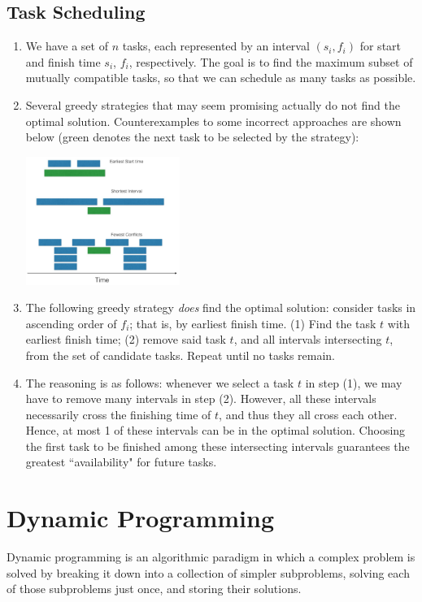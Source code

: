 \documentclass[10pt]{article}
\begin{document}
\begin{multicols}{2}
\begin{addmargin}[0.8em]{0.5em}
    \subsection{Task Scheduling}
    \begin{enumerate}[label=(\alph*)]
        \item We have a set of $n$ tasks, each represented by an interval $(s_i, f_i)$ for start and finish time $s_i$, $f_i$, respectively. The goal is to find the maximum subset of mutually compatible tasks, so that we can schedule as many tasks as possible.
        \item Several greedy strategies that may seem promising actually do not find the optimal solution. Counterexamples to some incorrect approaches are shown below (green denotes the next task to be selected by the strategy):
        \begin{center}
        \includegraphics[width=5cm]{scheduling.png}
        \end{center}
        \item The following greedy strategy \textit{does} find the optimal solution: consider tasks in ascending order of $f_i$; that is, by earliest finish time. (1) Find the task $t$ with earliest finish time; (2) remove said task $t$, and all intervals intersecting $t$, from the set of candidate tasks. Repeat until no tasks remain.
        \item The reasoning is as follows: whenever we select a task $t$ in step (1), we may have to remove many intervals in step (2). However, all these intervals necessarily cross the finishing time of $t$, and thus they all cross each other. Hence, at most 1 of these intervals can be in the optimal solution. Choosing the first task to be finished among these intersecting intervals guarantees the greatest ``availability" for future tasks.
    \end{enumerate}
\end{addmargin}

\section{Dynamic Programming}
\begin{addmargin}[0.8em]{0.5em}
Dynamic programming is an algorithmic paradigm in which a complex problem is solved by breaking it down into a collection of simpler subproblems, solving each of those subproblems just once, and storing their solutions.

\end{addmargin}
\end{multicols}
\end{document}
